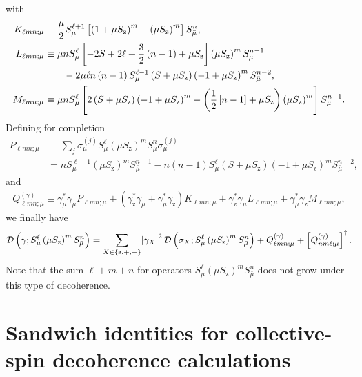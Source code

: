 \documentclass[aps,notitlepage,nofootinbib,11pt]{revtex4-1}
\newcommand{\f}[2]{\dfrac{#1}{#2}} %
\newcommand{\p}[1]{\left(#1\right)} %
\renewcommand{\sp}[1]{\left[#1\right]} %
\renewcommand{\set}[1]{\left\{#1\right\}} %
\newcommand{\D}{\mathcal{D}}
\newcommand{\z}{\text{z}}
\newcommand{\bmu}{{\bar\mu}}
\newcommand{\1}{\mathds{1}}
\begin{document}
with
\begin{align}
  K_{\ell mn;\mu}
  &\equiv \f{\mu}{2} S_\mu^{\ell+1}
  \sp{\p{1+\mu S_\z}^m-\p{\mu S_\z}^m} S_\bmu^n, \\
  L_{\ell mn;\mu}
  &\equiv \mu n S_\mu^\ell \sp{-2S+2\ell+\f32\p{n-1}+\mu S_\z}
  \p{\mu S_\z}^m S_\bmu^{n-1} \notag \\
  &\qquad - 2\mu\ell n\p{n-1} S_\mu^{\ell-1}
  \p{S+\mu S_\z} \p{-1+\mu S_\z}^m S_\bmu^{n-2}, \\
  M_{\ell mn;\mu}
  &\equiv \mu n S_\mu^\ell \sp{2\p{S+\mu S_\z}\p{-1+\mu S_\z}^m
    - \p{\f12\sp{n-1}+\mu S_\z}\p{\mu S_\z}^m} S_\bmu^{n-1}.
\end{align}
Defining for completion
\begin{align}
  P_{\ell mn;\mu}
  &\equiv \sum_j \sigma_\mu^{(j)} S_\mu^\ell
  \p{\mu S_\z}^m S_\bmu^n \sigma_\mu^{(j)} \\
  &= n S_\mu^{\ell+1} \p{\mu S_\z}^m S_\bmu^{n-1}
  - n\p{n-1} S_\mu^\ell \p{S+\mu S_\z} \p{-1+\mu S_\z}^m S_\bmu^{n-2},
\end{align}
and
\begin{align}
  Q_{\ell mn;\mu}^{(\gamma)}
  \equiv \gamma_\bmu^* \gamma_\mu P_{\ell mn;\mu}
  + \p{\gamma_\z^* \gamma_\mu + \gamma_\bmu^* \gamma_\z}
  K_{\ell mn;\mu}
  + \gamma_\z^* \gamma_\mu L_{\ell mn;\mu}
  + \gamma_\bmu^* \gamma_\z M_{\ell mn;\mu},
  \label{eq:Q_single}
\end{align}
we finally have
\begin{align}
  \D\p{\gamma; S_\mu^\ell \p{\mu S_\z}^m S_\bmu^n}
  = \sum_{X\in\set{\z,+,-}} \abs{\gamma_X}^2
  \D\p{\sigma_X; S_\mu^\ell \p{\mu S_\z}^m S_\bmu^n}
  + Q_{\ell mn;\mu}^{(\gamma)} + \sp{Q_{nm\ell;\mu}^{(\gamma)}}^\dag.
\end{align}
Note that the sum $\ell+m+n$ for operators
$S_\mu^\ell \p{\mu S_\z}^m S_\bmu^n$ does not grow under this type of
decoherence.


\section{Sandwich identities for collective-spin decoherence
  calculations}
\label{sec:sandwich_collective}
\end{document}
